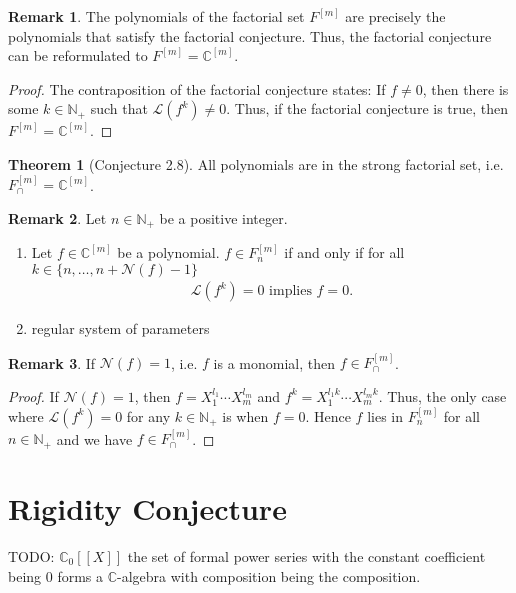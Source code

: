 \documentclass[a4paper]{article}
\theoremstyle{definition}
\newtheorem{theorem}[definition]{Theorem}
\newtheorem*{remark}{Remark}
\begin{document}
%
\begin{remark}
    The polynomials of the factorial set \(F^{[m]}\) are precisely the polynomials that satisfy the factorial conjecture. Thus, the factorial conjecture can be reformulated to \(F^{[m]} = \mathbb{C}^{[m]}\).
\end{remark}
%
\begin{proof}
    The contraposition of the factorial conjecture states: If \(f \neq 0\), then there is some \(k \in \mathbb{N}_+\) such that \(\mathcal{L}(f^k) \neq 0\). Thus, if the factorial conjecture is true, then \(F^{[m]} = \mathbb{C}^{[m]}\).
\end{proof}
%
\begin{theorem}[Conjecture 2.8]
    All polynomials are in the strong factorial set, i.e. \(F_\cap^{[m]} = \mathbb{C}^{[m]}\).
\end{theorem}
%
\begin{remark}
    Let \(n \in \mathbb{N}_+\) be a positive integer.
    \begin{enumerate}
        \item Let \(f \in \mathbb{C}^{[m]}\) be a polynomial. \(f \in F_n^{[m]}\) if and only if for all \(k \in \{n, \ldots, n + \mathcal{N}(f) - 1\}\)
        \begin{align*}
            \mathcal{L}(f^k) = 0 \text{ implies } f = 0 \text{.}
        \end{align*}
        \item regular system of parameters
    \end{enumerate}
\end{remark}
%
\begin{remark}
    If \(\mathcal{N}(f) = 1\), i.e. \(f\) is a monomial, then \(f \in F_\cap^{[m]}\).
\end{remark}
\begin{proof}
    If \(\mathcal{N}(f) = 1\), then \(f = X_1^{l_1} \cdots X_m^{l_m}\) and \(f^k = X_1^{l_1 k} \cdots X_m^{l_m k}\). Thus, the only case where \(\mathcal{L}(f^k) = 0\) for any \(k \in \mathbb{N}_+\) is when \(f = 0\). Hence \(f\) lies in \(F_n^{[m]}\) for all \(n \in \mathbb{N}_+\) and we have \(f \in F_\cap^{[m]}\).
\end{proof}
\newpage
\section{Rigidity Conjecture}

TODO: \(\mathbb{C}_0[[X]]\) the set of formal power series with the constant coefficient being \(0\) forms a \(\mathbb{C}\)-algebra with composition being the composition.
%
\end{document}
